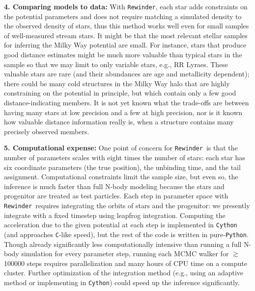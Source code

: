 \documentclass{emulateapj}
\newcommand{\project}[1]{\textsl{#1}}
\newcommand{\gaia}{\project{Gaia}}
\newcommand{\rewinder}{\texttt{Rewinder}}
\begin{document}
{\bf 4. Comparing models to data:} With \rewinder, each star adds constraints on the potential parameters and does not require matching a simulated density to the observed density of stars, thus this method works well even for small samples of well-measured stream stars. It might be that the most relevant stellar samples for inferring the Milky Way potential are small. For instance, stars that produce good distance estimates might be much more valuable than typical stars in the sample so that we may limit to only variable stars, e.g., RR Lyraes. These valuable stars are rare (and their abundances are age and metallicity dependent); there could be many cold structures in the Milky Way halo that are highly constraining on the potential in principle, but which contain only a few good distance-indicating members. It is not yet known what the trade-offs are between having many stars at low precision and a few at high precision, nor is it known how valuable distance information really is, when a structure contains many precisely observed members.

{\bf 5. Computational expense:} One point of concern for \rewinder\ is that the number of parameters scales with eight times the number of stars: each star has six coordinate parameters (the true position), the unbinding time, and the tail assignment. Computational constraints limit the sample size, but even so, the inference is much faster than full N-body modeling because the stars and progenitor are treated as test particles. Each step in parameter space with \rewinder\ requires integrating the orbits of stars and the progenitor: we presently integrate with a fixed timestep using leapfrog integration. Computing the acceleration due to the given potential at each step is implemented in \texttt{Cython} (and approaches \texttt{C}-like speed), but the rest of the code is written in pure-\texttt{Python}. Though already significantly less computationally intensive than running a full N-body simulation for every parameter step, running each MCMC walker for $\gtrsim$100000 steps requires parallelization and many hours of CPU time on a compute cluster. Further optimization of the integration method (e.g., using an adaptive method or implementing in \texttt{Cython}) could speed up the inference significantly. 

\end{document}
